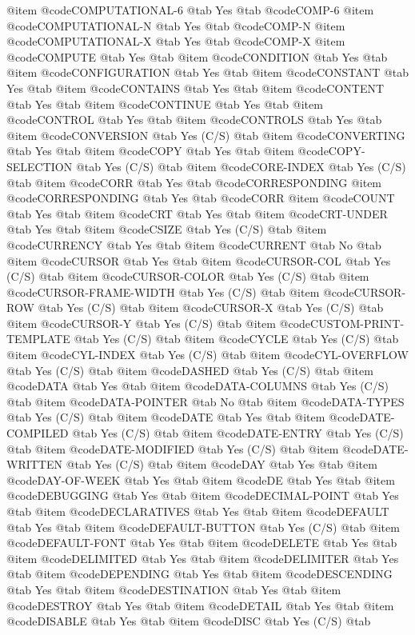@item @code{COMPUTATIONAL-6} @tab Yes @tab @code{COMP-6}
@item @code{COMPUTATIONAL-N} @tab Yes @tab @code{COMP-N}
@item @code{COMPUTATIONAL-X} @tab Yes @tab @code{COMP-X}
@item @code{COMPUTE} @tab Yes @tab
@item @code{CONDITION} @tab Yes @tab
@item @code{CONFIGURATION} @tab Yes @tab
@item @code{CONSTANT} @tab Yes @tab
@item @code{CONTAINS} @tab Yes @tab
@item @code{CONTENT} @tab Yes @tab
@item @code{CONTINUE} @tab Yes @tab
@item @code{CONTROL} @tab Yes @tab
@item @code{CONTROLS} @tab Yes @tab
@item @code{CONVERSION} @tab Yes	(C/S) @tab
@item @code{CONVERTING} @tab Yes @tab
@item @code{COPY} @tab Yes @tab
@item @code{COPY-SELECTION} @tab Yes	(C/S) @tab
@item @code{CORE-INDEX} @tab Yes (C/S) @tab
@item @code{CORR} @tab Yes @tab @code{CORRESPONDING}
@item @code{CORRESPONDING} @tab Yes @tab @code{CORR}
@item @code{COUNT} @tab Yes @tab
@item @code{CRT} @tab Yes @tab
@item @code{CRT-UNDER} @tab Yes @tab
@item @code{CSIZE} @tab Yes	(C/S) @tab
@item @code{CURRENCY} @tab Yes @tab
@item @code{CURRENT} @tab No @tab
@item @code{CURSOR} @tab Yes @tab
@item @code{CURSOR-COL} @tab Yes	(C/S) @tab
@item @code{CURSOR-COLOR} @tab Yes	(C/S) @tab
@item @code{CURSOR-FRAME-WIDTH} @tab Yes	(C/S) @tab
@item @code{CURSOR-ROW} @tab Yes	(C/S) @tab
@item @code{CURSOR-X} @tab Yes	(C/S) @tab
@item @code{CURSOR-Y} @tab Yes	(C/S) @tab
@item @code{CUSTOM-PRINT-TEMPLATE} @tab Yes	(C/S) @tab
@item @code{CYCLE} @tab Yes	(C/S) @tab
@item @code{CYL-INDEX} @tab Yes (C/S) @tab
@item @code{CYL-OVERFLOW} @tab Yes (C/S) @tab
@item @code{DASHED} @tab Yes	(C/S) @tab
@item @code{DATA} @tab Yes @tab
@item @code{DATA-COLUMNS} @tab Yes	(C/S) @tab
@item @code{DATA-POINTER} @tab No @tab
@item @code{DATA-TYPES} @tab Yes	(C/S) @tab
@item @code{DATE} @tab Yes @tab
@item @code{DATE-COMPILED} @tab Yes (C/S) @tab
@item @code{DATE-ENTRY} @tab Yes	(C/S) @tab
@item @code{DATE-MODIFIED} @tab Yes (C/S) @tab
@item @code{DATE-WRITTEN} @tab Yes (C/S) @tab
@item @code{DAY} @tab Yes @tab
@item @code{DAY-OF-WEEK} @tab Yes @tab
@item @code{DE} @tab Yes @tab
@item @code{DEBUGGING} @tab Yes @tab
@item @code{DECIMAL-POINT} @tab Yes @tab
@item @code{DECLARATIVES} @tab Yes @tab
@item @code{DEFAULT} @tab Yes @tab
@item @code{DEFAULT-BUTTON} @tab Yes	(C/S) @tab
@item @code{DEFAULT-FONT} @tab Yes @tab
@item @code{DELETE} @tab Yes @tab
@item @code{DELIMITED} @tab Yes @tab
@item @code{DELIMITER} @tab Yes @tab
@item @code{DEPENDING} @tab Yes @tab
@item @code{DESCENDING} @tab Yes @tab
@item @code{DESTINATION} @tab Yes @tab
@item @code{DESTROY} @tab Yes @tab
@item @code{DETAIL} @tab Yes @tab
@item @code{DISABLE} @tab Yes @tab
@item @code{DISC} @tab Yes	(C/S) @tab
